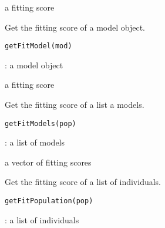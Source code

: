 \documentclass[a4paper]{book}
\begin{document}
%
\begin{Value}
a fitting score
\end{Value}
%
\begin{Description}
Get the fitting score of a model object.
\end{Description}
%
\begin{Usage}
\begin{verbatim}
getFitModel(mod)
\end{verbatim}
\end{Usage}
%
\begin{Arguments}
\begin{ldescription}
\item[\code{mod}] : a model object
\end{ldescription}
\end{Arguments}
%
\begin{Value}
a fitting score
\end{Value}
%
\begin{Description}
Get the fitting score of a list a models.
\end{Description}
%
\begin{Usage}
\begin{verbatim}
getFitModels(pop)
\end{verbatim}
\end{Usage}
%
\begin{Arguments}
\begin{ldescription}
\item[\code{pop}] : a list of models
\end{ldescription}
\end{Arguments}
%
\begin{Value}
a vector of fitting scores
\end{Value}
%
\begin{Description}
Get the fitting score of a list of individuals.
\end{Description}
%
\begin{Usage}
\begin{verbatim}
getFitPopulation(pop)
\end{verbatim}
\end{Usage}
%
\begin{Arguments}
\begin{ldescription}
\item[\code{pop}] : a list of individuals
\end{ldescription}
\end{Arguments}
\end{document}
